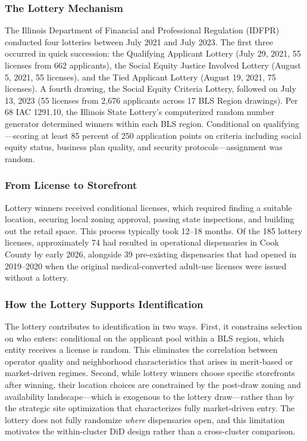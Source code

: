 \documentclass[12pt]{article}
\begin{document}
\subsubsection*{The Lottery Mechanism} The Illinois Department of Financial and Professional Regulation (IDFPR) conducted four lotteries between July 2021 and July 2023. The first three occurred in quick succession: the Qualifying Applicant Lottery (July 29, 2021, 55 licenses from 662 applicants), the Social Equity Justice Involved Lottery (August 5, 2021, 55 licenses), and the Tied Applicant Lottery (August 19, 2021, 75 licenses). A fourth drawing, the Social Equity Criteria Lottery, followed on July 13, 2023 (55 licenses from 2,676 applicants across 17 BLS Region drawings). Per 68 IAC 1291.10, the Illinois State Lottery's computerized random number generator determined winners within each BLS region. Conditional on qualifying---scoring at least 85 percent of 250 application points on criteria including social equity status, business plan quality, and security protocols---assignment was random.

\subsubsection*{From License to Storefront} Lottery winners received conditional licenses, which required finding a suitable location, securing local zoning approval, passing state inspections, and building out the retail space. This process typically took 12--18 months. Of the 185 lottery licenses, approximately 74 had resulted in operational dispensaries in Cook County by early 2026, alongside 39 pre-existing dispensaries that had opened in 2019--2020 when the original medical-converted adult-use licenses were issued without a lottery.

\subsubsection*{How the Lottery Supports Identification} The lottery contributes to identification in two ways. First, it constrains selection on who enters: conditional on the applicant pool within a BLS region, which entity receives a license is random. This eliminates the correlation between operator quality and neighborhood characteristics that arises in merit-based or market-driven regimes. Second, while lottery winners choose specific storefronts after winning, their location choices are constrained by the post-draw zoning and availability landscape---which is exogenous to the lottery draw---rather than by the strategic site optimization that characterizes fully market-driven entry. The lottery does not fully randomize \textit{where} dispensaries open, and this limitation motivates the within-cluster DiD design rather than a cross-cluster comparison.
\end{document}
